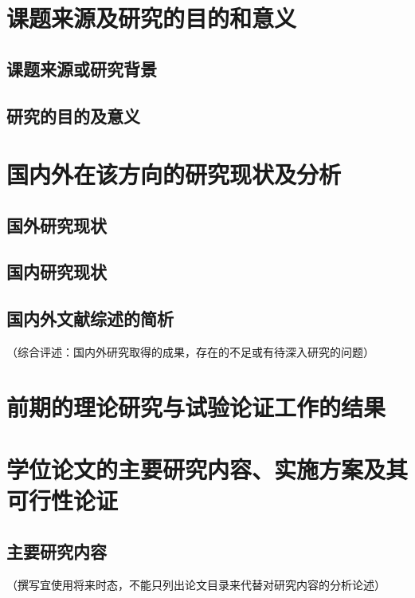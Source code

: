 \section{课题来源及研究的目的和意义}
\subsection{课题来源或研究背景}
\subsection{研究的目的及意义}
\section{国内外在该方向的研究现状及分析}
\subsection{国外研究现状}
\subsection{国内研究现状}
\subsection{国内外文献综述的简析}
（综合评述：国内外研究取得的成果，存在的不足或有待深入研究的问题）
\section{前期的理论研究与试验论证工作的结果}
\section{学位论文的主要研究内容、实施方案及其可行性论证}
\subsection{主要研究内容}
（撰写宜使用将来时态，不能只列出论文目录来代替对研究内容的分析论述）
